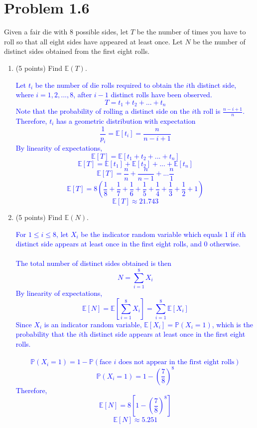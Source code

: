 \documentclass{article}
\begin{document}
\section*{Problem 1.6}
Given a fair die with 8 possible sides, let $T$ be the number of times you have to roll so that all eight sides have appeared at least once. Let $N$ be the number of distinct sides obtained from the first eight rolls.

\begin{enumerate}[label=(\alph*)]
    \item (5 points) Find $\mathbb{E}(T)$.

        \textcolor{blue}{Let $t_i$ be the number of die rolls required to obtain the $i$th distinct side, where $i=1,2,...,8$, after $i-1$ distinct rolls have been observed.
            $$T=t_1+t_2+...+t_n$$
            Note that the probability of rolling a distinct side on the $i$th roll is $\frac{n-i+1}{n}$. Therefore, $t_i$ has a geometric distribution with expectation $$\frac{1}{p_i}=\mathbb{E}[t_i]=\frac{n}{n-i+1}$$
            By linearity of expectations, $$\mathbb{E}[T]=\mathbb{E}[t_1+t_2+...+t_n]$$
            $$\mathbb{E}[T]=\mathbb{E}[t_1]+\mathbb{E}[t_2]+...+\mathbb{E}[t_n]$$
            $$\mathbb{E}[T]=\frac{n}{n}+\frac{n}{n-1}+...\frac{n}{1}$$
            $$\mathbb{E}[T]= 8\left(\frac{1}{8} + \frac{1}{7} + \frac{1}{6} + \frac{1}{5} + \frac{1}{4} + \frac{1}{3} + \frac{1}{2} + 1 \right)$$
$$\mathbb{E}[T]\approx 21.743$$}

    \item (5 points) Find $\mathbb{E}(N)$.

    \textcolor{blue}{For $1\leq i \leq 8$, let $X_i$ be the indicator random variable which equals 1 if $i$th distinct side appears at least once in the first eight rolls, and 0 otherwise. \\ \\ 
    The total number of distinct sides obtained is then $$N=\sum_{i=1}^{8}X_i$$
By linearity of expectations, $$\mathbb{E}[N]=\mathbb{E}[\sum_{i=1}^{8}X_i]=\sum_{i=1}^{8}\mathbb{E}[X_i]$$
Since $X_i$ is an indicator random variable, $\mathbb{E}[X_i]=\mathbb{P}(X_i=1)$, which is the probability that the $i$th distinct side appears at least once in the first eight rolls. \\ \\
$$\mathbb{P}(X_i=1)=1-\mathbb{P}(\text{face $i$ does not appear in the first eight rolls})$$
$$\mathbb{P}(X_i=1)=1-\left(\frac{7}{8}\right)^8$$
Therefore, $$\mathbb{E}[N]=8\left[1-\left( \frac{7}{8} \right)^8 \right]$$
$$\mathbb{E}[N]\approx 5.251$$}



\end{enumerate}
\end{document}
